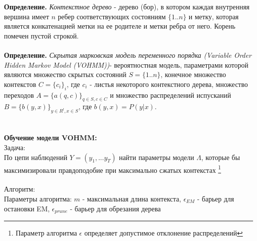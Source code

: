\documentclass[10pt,a4paper]{article}
\begin{document}
\textbf{Определение.} \textit{Контекстное дерево} - дерево (бор), в котором каждая внутренняя вершина имеет $ n $ ребер соответствующих состояниям $ \{1..n\} $ и метку, которая является конкатенацией метки на ее родителе и метки ребра от него. Корень помечен пустой строкой. 
\\\\
\textbf{Определение.} \textit{Скрытая марковская модель переменного порядка (Variable Order Hidden Markov Model (VOHMM))}- вероятностная модель, параметрами которой являются множество скрытых состояний $ S = \{1..n\} $, конечное множество контекстов $ C=\{c_{i}\}_{i} $, где $ c_{i} $ - листья некоторого контекстного дерева, множество переходов $ A = \{a(q, c)\}_{q \in S, c \in C}$ и множество распределений испусканий $ B = \{b(y,x)\}_{y \in R^{l}, x \in S}$, где $ b(y, x) = P(y|x)$.  
\\\\\\
\textbf{Обучение модели VOHMM:}
\\
{\large Задача:} 
\\
По цепи наблюдений $ Y = (y_{1}, ... y_{T}) $ найти параметры модели $ \Lambda$, 
которые бы максимизировали правдоподобие при максимально сжатых контекстах 
\footnote{Параметр алгоритма $ \epsilon $ определяет допустимое отклонение распределений}
\\\\
{\large Алгоритм:}
\\
Параметры алгоритма: 
$ m $ - максимальная длина контекста, 
$ \epsilon_{EM} $ - барьер для остановки EM,
$ \epsilon_{prune} $ - барьер для обрезания дерева
\\
\end{document}
